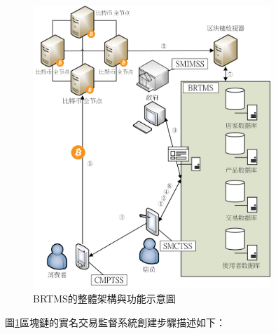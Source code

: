 	\begin{figure}[!htbp]
		\centering
		\includegraphics[width = 0.8\textwidth]{fig4.png}
		\caption{BRTMS的整體架構與功能示意圖}\label{fig4}
	\end{figure}

	圖\ref{fig4}區塊鏈的實名交易監督系統創建步驟描述如下：

